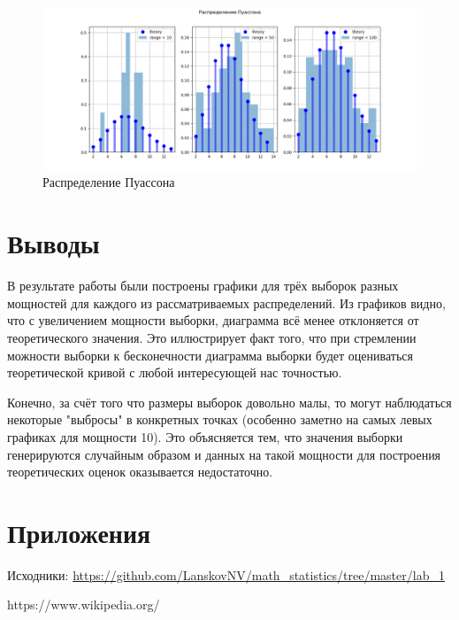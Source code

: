 \documentclass[12pt]{article}
\begin{document}
\pagebreak

\begin{figure}[h!]
\begin{center}
\includegraphics[width=\textwidth]{poisson.png}
\caption{Распределение Пуассона}
\end{center}
\end{figure}

\section{Выводы}

В результате работы были построены графики для трёх выборок разных мощностей для каждого из рассматриваемых распределений. Из графиков видно, что с увеличением мощности выборки, диаграмма всё менее отклоняется от теоретического значения. Это иллюстрирует факт того, что при стремлении можности выборки к бесконечности диаграмма выборки будет оцениваться теоретической кривой с любой интересующей нас точностью.
\par
Конечно, за счёт того что размеры выборок довольно малы, то могут наблюдаться некоторые "выбросы" в конкретных точках (особенно заметно на самых левых графиках для мощности 10). Это объясняется тем, что значения выборки генерируются случайным образом и данных на такой мощности для построения теоретических оценок оказывается недостаточно.

\section{Приложения}

Исходники: \url{https://github.com/LanskovNV/math_statistics/tree/master/lab_1}

\begin{thebibliography}{}
     https://www.wikipedia.org/
\end{thebibliography}
\end{document}
